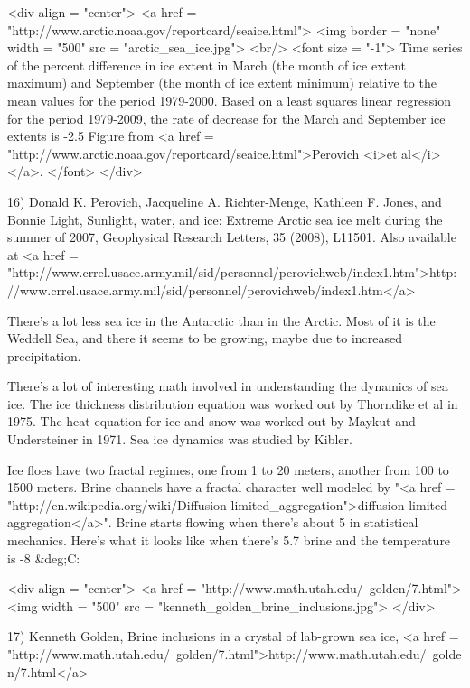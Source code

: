<div align = "center">
<a href = "http://www.arctic.noaa.gov/reportcard/seaice.html">
<img border = "none" width = "500" src = "arctic_sea_ice.jpg">
<br/>
<font size = "-1">
Time series of the percent difference in ice extent in March (the month of 
ice extent maximum) and September (the month of ice extent minimum) relative 
to the mean values for the period 1979-2000. Based on a least squares linear 
regression for the period 1979-2009, the rate of decrease for the March 
and September ice extents is -2.5%
Figure from <a href = "http://www.arctic.noaa.gov/reportcard/seaice.html">Perovich <i>et al</i></a>.
</font>
</div>

16) Donald K. Perovich, Jacqueline A. Richter-Menge, Kathleen
F. Jones, and Bonnie Light, Sunlight, water, and ice: Extreme Arctic
sea ice melt during the summer of 2007, Geophysical Research Letters,
35 (2008), L11501.  Also available at 
<a href = "http://www.crrel.usace.army.mil/sid/personnel/perovichweb/index1.htm">http://www.crrel.usace.army.mil/sid/personnel/perovichweb/index1.htm</a>

There's a lot less sea ice in the Antarctic than in the Arctic.
Most of it is the Weddell Sea, and there it seems to be
growing, maybe due to increased precipitation.

There's a lot of interesting math involved in understanding the
dynamics of sea ice.  The ice thickness distribution equation was
worked out by Thorndike et al in 1975.  The heat equation for ice and
snow was worked out by Maykut and Understeiner in 1971.  Sea ice
dynamics was studied by Kibler.

Ice floes have two fractal regimes, one from 1 to 20 meters, another
from 100 to 1500 meters.  Brine channels have a fractal character well
modeled by "<a href =
"http://en.wikipedia.org/wiki/Diffusion-limited_aggregation">diffusion
limited aggregation</a>".  Brine starts flowing when there's
about 5%
in statistical mechanics.  Here's what it looks like when there's 5.7%
brine and the temperature is -8 &deg;C:

<div align = "center">
<a href = "http://www.math.utah.edu/~golden/7.html">
<img width = "500" src = "kenneth_golden_brine_inclusions.jpg">
</div>

17) Kenneth Golden, Brine inclusions in a crystal of lab-grown sea
ice, <a href =
"http://www.math.utah.edu/~golden/7.html">http://www.math.utah.edu/~golden/7.html</a>


